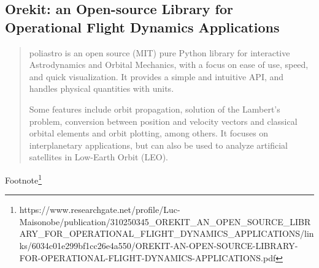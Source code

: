 \subsection{Orekit: an Open-source Library for Operational Flight Dynamics Applications}
\begin{quotation}
poliastro is an open source (MIT) pure Python library for interactive Astrodynamics and Orbital Mechanics, with a focus on ease of use, speed, and quick visualization. It provides a simple and intuitive API, and handles physical quantities with units.

Some features include orbit propagation, solution of the Lambert's problem, conversion between position and velocity vectors and classical orbital elements and orbit plotting, among others. It focuses on interplanetary applications, but can also be used to analyze artificial satellites in Low-Earth Orbit (LEO).
\end{quotation}

Footnote\footnote{https://www.researchgate.net/profile/Luc-Maisonobe/publication/310250345\_OREKIT\_AN\_OPEN\_SOURCE\_LIBRARY\_FOR\_OPERATIONAL\_FLIGHT\_DYNAMICS\_APPLICATIONS/links/6034c01e299bf1cc26e4a550/OREKIT-AN-OPEN-SOURCE-LIBRARY-FOR-OPERATIONAL-FLIGHT-DYNAMICS-APPLICATIONS.pdf}

	

\endinput  %

